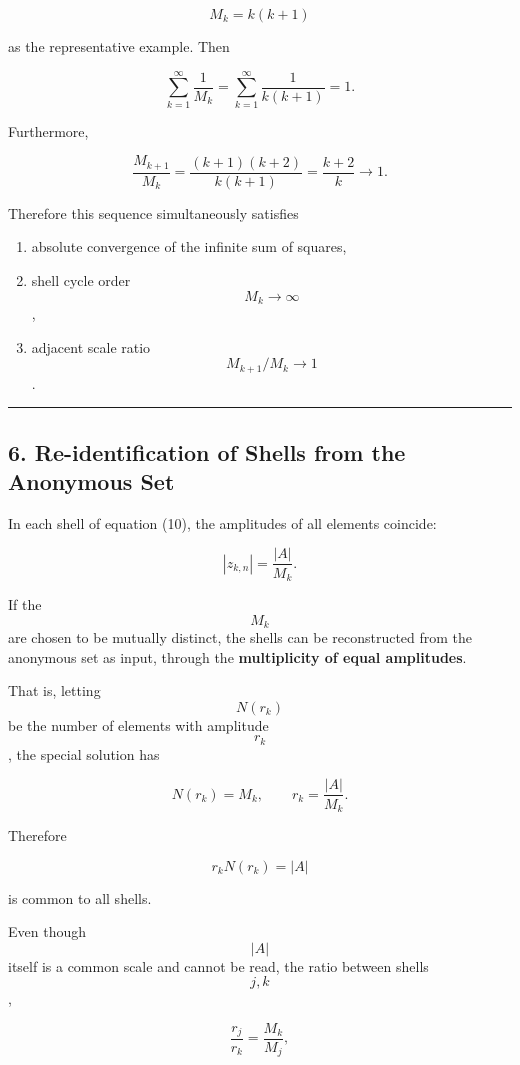 \documentclass[
  a4paper,
]{article}
\providecommand{\tightlist}{%
  \setlength{\itemsep}{0pt}\setlength{\parskip}{0pt}}
\begin{document}
\[
\boxed{
M_k=k(k+1)
}
\tag{16}
\]

as the representative example. Then

\[
\sum_{k=1}^{\infty}\frac{1}{M_k}
=
\sum_{k=1}^{\infty}
\frac{1}{k(k+1)}
=1.
\tag{17}
\]

Furthermore,

\[
\frac{M_{k+1}}{M_k}
=
\frac{(k+1)(k+2)}{k(k+1)}
=
\frac{k+2}{k}
\longrightarrow1.
\tag{18}
\]

Therefore this sequence simultaneously satisfies

\begin{enumerate}
\def\labelenumi{\arabic{enumi}.}
\tightlist
\item
  absolute convergence of the infinite sum of squares,
\item
  shell cycle order \[M_k\to\infty\],
\item
  adjacent scale ratio \[M_{k+1}/M_k\to1\].
\end{enumerate}

\begin{center}\rule{0.5\linewidth}{0.5pt}\end{center}

\subsection{6. Re-identification of Shells from the Anonymous
Set}\label{re-identification-of-shells-from-the-anonymous-set}

In each shell of equation (10), the amplitudes of all elements coincide:

\[
|z_{k,n}|
=
\frac{|A|}{M_k}.
\tag{19}
\]

If the \[M_k\] are chosen to be mutually distinct, the shells can be
reconstructed from the anonymous set as input, through the
\textbf{multiplicity of equal amplitudes}.

That is, letting \[N(r_k)\] be the number of elements with amplitude
\[r_k\], the special solution has

\[
N(r_k)=M_k,
\qquad
r_k=\frac{|A|}{M_k}.
\tag{20}
\]

Therefore

\[
\boxed{
r_kN(r_k)=|A|
}
\tag{21}
\]

is common to all shells.

Even though \[|A|\] itself is a common scale and cannot be read, the
ratio between shells \[j,k\],

\[
\frac{r_j}{r_k}
=
\frac{M_k}{M_j},
\tag{22}
\]
\end{document}
